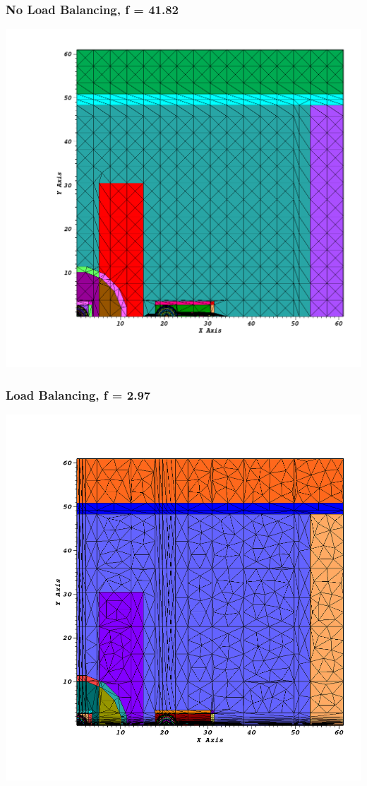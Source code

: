 \documentclass[xcolor={usenames,dvipsnames,svgnames,table}]{beamer}
\begin{document}
\begin{frame}[t]\frametitle{No Load Balancing, f = 41.82}
\centering
\includegraphics[scale=0.25]{figures/im12d_nolb.png}
\end{frame}

\begin{frame}[t]\frametitle{Load Balancing, f = 2.97}
\centering
\includegraphics[trim={1cm 0cm 0cm 3cm},clip,scale=0.25]{figures/im12d_oldlb.png}
\end{frame}
\end{document}

